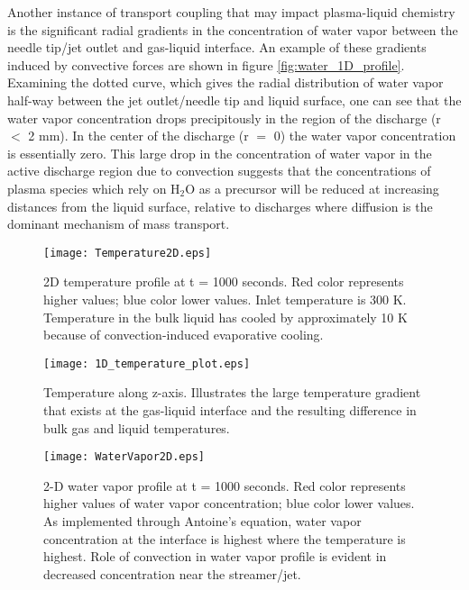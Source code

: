 Another instance of transport coupling that may impact plasma-liquid chemistry is the significant radial gradients in the concentration of water vapor between the needle tip/jet outlet and gas-liquid interface. An example of these gradients induced by convective forces are shown in figure \ref{fig:water_1D_profile}. Examining the dotted curve, which gives the radial distribution of water vapor half-way between the jet outlet/needle tip and liquid surface, one can see that the water vapor concentration drops precipitously in the region of the discharge (r $<$ 2 mm). In the center of the discharge (r $=$ 0) the water vapor concentration is essentially zero. This large drop in the concentration of water vapor in the active discharge region due to convection suggests that the concentrations of plasma species which rely on H$_2$O as a precursor will be reduced at increasing distances from the liquid surface, relative to  discharges where diffusion is the dominant mechanism of mass transport.

\begin{figure}[htb]
    \centering
        \texttt{[image: Temperature2D.eps]}
        \caption{2D temperature profile at t = 1000 seconds. Red color represents higher values; blue color lower values. Inlet temperature is 300 K. Temperature in the bulk liquid has cooled by approximately 10 K because of convection-induced evaporative cooling.}
        \label{fig:temp_2D_profile}
\end{figure}

\begin{figure}[htb]
    \centering
        \texttt{[image: 1D\_temperature\_plot.eps]}
        \caption{Temperature along z-axis. Illustrates the large temperature gradient that exists at the gas-liquid interface and the resulting difference in bulk gas and liquid temperatures.}
        \label{fig:temp_1D_profile}
\end{figure}

\begin{figure}[htb]
    \centering
        \texttt{[image: WaterVapor2D.eps]}
        \caption{2-D water vapor profile at t = 1000 seconds. Red color represents higher values of water vapor concentration; blue color lower values. As implemented through Antoine's equation, water vapor concentration at the interface is highest where the temperature is highest. Role of convection in water vapor profile is evident in decreased concentration near the streamer/jet.}
        \label{fig:water_2D_profile}
\end{figure}


